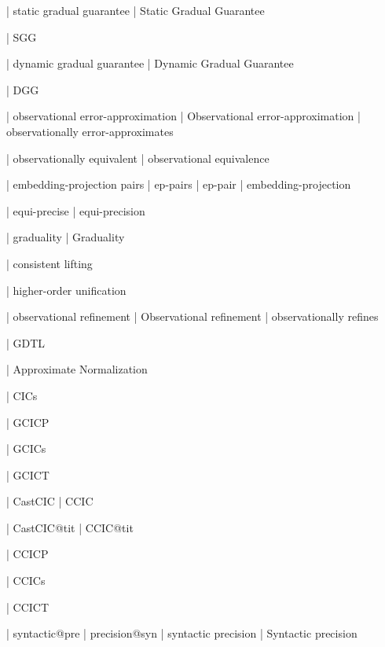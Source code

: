   | static gradual guarantee
  | Static Gradual Guarantee

  | SGG

  | dynamic gradual guarantee
  | Dynamic Gradual Guarantee

  | DGG

  | observational error-approximation
  | Observational error-approximation
  | observationally error-approximates

  | observationally equivalent
  | observational equivalence

  | embedding-projection pairs
  | ep-pairs
  | ep-pair
  | embedding-projection

  | equi-precise
  | equi-precision

  | graduality
  | Graduality

  | consistent lifting

  | higher-order unification

  | observational refinement
  | Observational refinement
  | observationally refines

  | GDTL

  | Approximate Normalization

  | CICs

  | GCICP

  | GCICs

  | GCICT

  | CastCIC
  | CCIC

  | CastCIC@tit
  | CCIC@tit

  | CCICP

  | CCICs

  | CCICT

  | syntactic@pre
  | precision@syn
  | syntactic precision
  | Syntactic precision

